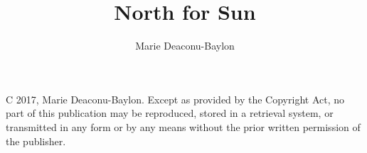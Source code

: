 \documentclass[openany,10pt]{memoir}
\author{Marie Deaconu-Baylon}
\title{North for Sun}
\date{}
\begin{document}
\frontmatter

\clearpage

\maketitle 

\thispagestyle{empty}

\clearpage



\textcircled{\tiny{C}} 2017, Marie Deaconu-Baylon.  Except as provided by the Copyright Act, no part of this publication may be reproduced, stored in a retrieval system, or transmitted in any form or by any means without the prior written permission of the publisher. 


\clearpage 

 
\clearpage

\mainmatter



 

\backmatter


\newpage\null\thispagestyle{empty}\newpage

\setlength{\parskip}{8pt}
\setlength{\parindent}{0pt}
\newpage
\null
 
\end{document}
